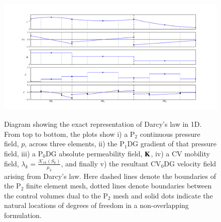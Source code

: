 \clearpage


\begin{figure}[htp]
\begin{center}
\hbox{\hspace{-2.cm}
\includegraphics[width=1.3\textwidth,height=1.3\textwidth]{diagrams/overlapping_cartoon}}
\vspace{-1.4cm}
\caption{Diagram showing the exact representation of Darcy's law in 1D. From top to bottom, the plots show i) a P$_{2}$ continuous pressure field, $p$, across three elements, ii) the P$_{1}$DG gradient of that  pressure field, iii) a P$_{0}$DG absolute permeability field, ${\bf K}$, iv) a CV mobility field, $\lambda_{k}=\frac{\mathcal{K}_{rk}\left(S_{k}\right)}{\mu_{k}}$, and finally v) the resultant CV$_{0}$DG velocity field arising from Darcy's law. Here dashed lines denote the boundaries of the P$_{2}$ finite element mesh, dotted lines denote boundaries between the control volumes dual to the P$_{2}$ mesh and solid dots indicate the natural locations of degrees of freedom in a non-overlapping formulation. }
\label{fig:darcys_law}
\end{center}
\end{figure}

